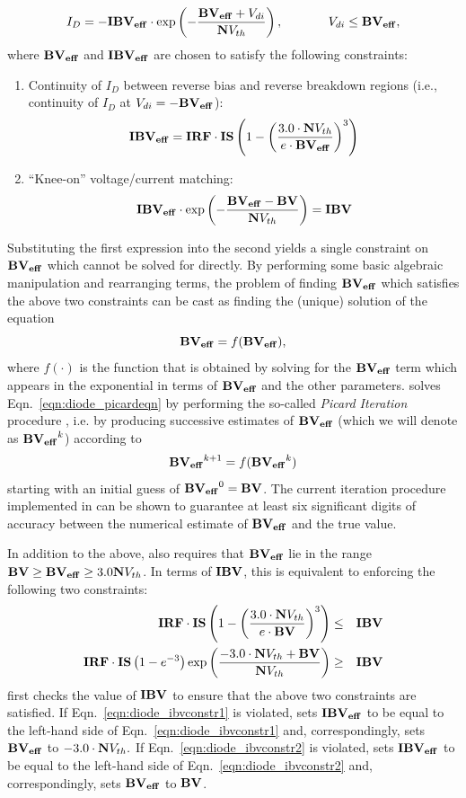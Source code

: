 \[
I_D = -\mathbf{IBV_{eff}}\cdot\exp \left(-\frac{\mathbf{BV_{eff}} + V_{di}}{\mathbf{N}V_{th}}
\right), \hspace*{0.5in} V_{di} \leq \mathbf{BV_{eff}},
\]
where $\mathbf{BV_{eff}}$ and $\mathbf{IBV_{eff}}$ are chosen to satisfy the following
constraints:
\begin{enumerate}
\item Continuity of $I_D$ between reverse bias and reverse breakdown regions
(i.e., continuity of $I_D$ at $V_{di}=-\mathbf{BV_{eff}}$):
\[
\mathbf{IBV_{eff}}=\mathbf{IRF}\cdot\mathbf{IS}\left(1-\left(\frac{3.0\cdot\mathbf{N} V_{th}}{e\cdot\mathbf{BV_{eff}}}
\right)^3\right)
\]
\item ``Knee-on'' voltage/current matching:
\[
\mathbf{IBV_{eff}}\cdot\exp\left(-\frac{\mathbf{BV_{eff}}-\mathbf{BV}}{\mathbf{N} V_{th}}\right)=\mathbf{IBV}
\]
\end{enumerate}
Substituting the first expression into the second yields a single constraint
on $\mathbf{BV_{eff}}$ which cannot be solved for directly.  By performing some basic
algebraic manipulation and rearranging terms, the problem of finding
$\mathbf{BV_{eff}}$ which satisfies the above two constraints can be cast as finding
the (unique) solution of the equation
\begin{equation}
\mathbf{BV_{eff}} = f(\mathbf{BV_{eff}}),
\label{eqn:diode_picardeqn}
\end{equation}
where $f(\cdot)$ is the function that is obtained by solving for the
$\mathbf{BV_{eff}}$ term which appears in the exponential in terms of $\mathbf{BV_{eff}}$ and the
other parameters.  \Xyce{} solves Eqn.\ \ref{eqn:diode_picardeqn} by performing
the so-called {\em Picard Iteration} procedure \cite{mattuck:1999}, i.e.
by producing successive estimates of $\mathbf{BV_{eff}}$ (which we will denote as
$\mathbf{BV_{eff}} ^ k$) according to
\[
\mathbf{BV_{eff}}^{k+1}=f(\mathbf{BV_{eff}}^k)
\]
starting with an initial guess of $\mathbf{BV_{eff}}^0=\mathbf{BV}$.  The current iteration
procedure implemented in \Xyce{} can be shown to guarantee at least six
significant digits of accuracy between the numerical estimate of $\mathbf{BV_{eff}}$ and
the true value.

In addition to the above, \Xyce{} also requires that $\mathbf{BV_{eff}}$ lie in the
range \mbox{$\mathbf{BV} \geq \mathbf{BV_{eff}} \geq 3.0\mathbf{N} V_{th}$.}  In terms of $\mathbf{IBV}   $,
this is equivalent to enforcing the following two constraints:
\begin{eqnarray}
\mathbf{IRF}\cdot\mathbf{IS}\left(1-\left(\frac{3.0\cdot\mathbf{N} V_{th}}{e\cdot\mathbf{BV}}\right)^3\right) & \leq & \mathbf{IBV} \label{eqn:diode_ibvconstr1}\\
\mathbf{IRF}\cdot\mathbf{IS}\left(1-e^{-3}\right)\exp\left(\frac{-3.0\cdot\mathbf{N} V_{th}+
\mathbf{BV}}{\mathbf{N} V_{th}}\right) & \geq & \mathbf{IBV} \label{eqn:diode_ibvconstr2}
\end{eqnarray}
\Xyce{} first checks the value of $\mathbf{IBV}$ to ensure that the above two
constraints are satisfied.  If Eqn.\ \ref{eqn:diode_ibvconstr1} is violated,
\Xyce{} sets $\mathbf{IBV_{eff}}$ to be equal to the left-hand side of Eqn.\
\ref{eqn:diode_ibvconstr1} and, correspondingly, sets $\mathbf{BV_{eff}}$ to $-3.0\cdot
\mathbf{N} V_{th}.$  If Eqn.\ \ref{eqn:diode_ibvconstr2} is violated, \Xyce{} sets
$\mathbf{IBV_{eff}}$ to be equal to the left-hand side of Eqn.\
\ref{eqn:diode_ibvconstr2} and, correspondingly, sets $\mathbf{BV_{eff}}$ to $\mathbf{BV}$.

